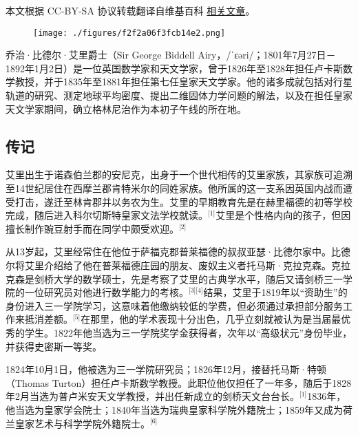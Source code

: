 
本文根据 CC-BY-SA 协议转载翻译自维基百科 \href{https://en.wikipedia.org/wiki/George_Biddell_Airy}{相关文章}。

\begin{figure}[ht]
\centering
\texttt{[image: ./figures/f2f2a06f3fcb14e2.png]}
\caption{} \label{fig_AL_1}
\end{figure}
乔治·比德尔·艾里爵士（Sir George Biddell Airy，/ˈɛəri/；1801年7月27日－1892年1月2日）是一位英国数学家和天文学家，曾于1826年至1828年担任卢卡斯数学教授，并于1835年至1881年担任第七任皇家天文学家。他的诸多成就包括对行星轨道的研究、测定地球平均密度、提出二维固体力学问题的解法，以及在担任皇家天文学家期间，确立格林尼治作为本初子午线的所在地。
\subsection{传记}
艾里出生于诺森伯兰郡的安尼克，出身于一个世代相传的艾里家族，其家族可追溯至14世纪居住在西摩兰郡肯特米尔的同姓家族。他所属的这一支系因英国内战而遭受打击，遂迁至林肯郡并以务农为生。艾里的早期教育先是在赫里福德的初等学校完成，随后进入科尔切斯特皇家文法学校就读。\(^\text{[1]}\)艾里是个性格内向的孩子，但因擅长制作豌豆射手而在同学中颇受欢迎。\(^\text{[2]}\)

从13岁起，艾里经常住在他位于萨福克郡普莱福德的叔叔亚瑟·比德尔家中。比德尔将艾里介绍给了他在普莱福德庄园的朋友、废奴主义者托马斯·克拉克森。克拉克森是剑桥大学的数学硕士，先是考察了艾里的古典学水平，随后又请剑桥三一学院的一位研究员对他进行数学能力的考核。\(^\text{[3][4]}\)结果，艾里于1819年以“资助生”的身份进入三一学院学习，这意味着他缴纳较低的学费，但必须通过承担部分服务工作来抵消差额。\(^\text{[5]}\)在那里，他的学术表现十分出色，几乎立刻就被认为是当届最优秀的学生。1822年他当选为三一学院奖学金获得者，次年以“高级状元”身份毕业，并获得史密斯一等奖。

1824年10月1日，他被选为三一学院研究员；1826年12月，接替托马斯·特顿（Thomas Turton）担任卢卡斯数学教授。此职位他仅担任了一年多，随后于1828年2月当选为普卢米安天文学教授，并出任新成立的剑桥天文台台长。\(^\text{[1]}\)1836年，他当选为皇家学会院士；1840年当选为瑞典皇家科学院外籍院士；1859年又成为荷兰皇家艺术与科学学院外籍院士。\(^\text{[6]}\)
